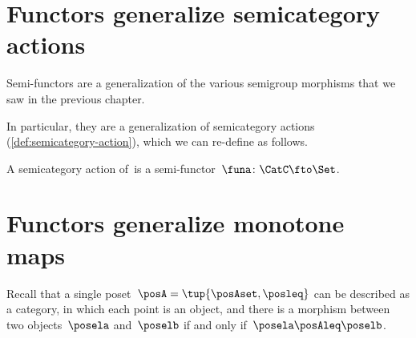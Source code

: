 
\section[\dots as semicategory actions]{Functors generalize semicategory actions}


Semi-functors are a generalization of the various semigroup morphisms that we saw in the previous chapter.


In particular, they are a generalization of semicategory actions (\cref{def:semicategory-action}), which we can re-define as follows.

\begin{ctdefinition}\label{def:semicat-action-redefined}
    A semicategory action of~\CatC is a semi-functor~$\funa\colon \CatC \fto \Set$.
\end{ctdefinition}

\section[\dots as monotone maps]{Functors generalize monotone maps}
\label{sec:posetsarecats}


Recall that a single poset~$\posA=\tup{\posAset, \posleq}$ can be described as a category, in which each point is an object, and there is a morphism between two objects~$\posela$ and~$\poselb$ if and only if~$\posela \posAleq \poselb$.

